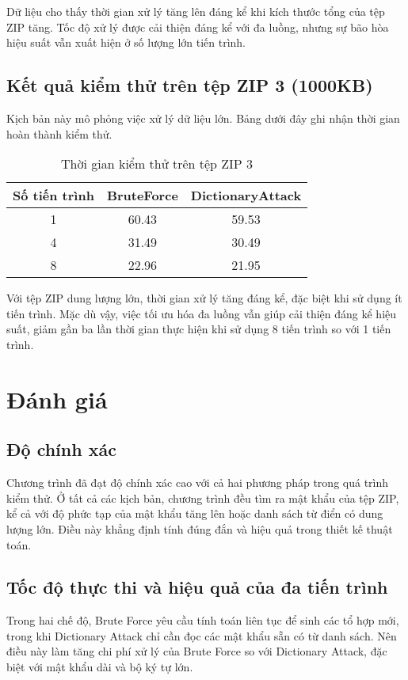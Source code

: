 \documentclass[../DoAn.tex]{subfiles}
\begin{document}
Dữ liệu cho thấy thời gian xử lý tăng lên đáng kể khi kích thước tổng của tệp ZIP tăng. Tốc độ xử lý được cải thiện đáng kể với đa luồng, nhưng sự bão hòa hiệu suất vẫn xuất hiện ở số lượng lớn tiến trình.

\subsection{Kết quả kiểm thử trên tệp ZIP 3 (1000KB)} 

Kịch bản này mô phỏng việc xử lý dữ liệu lớn. Bảng dưới đây ghi nhận thời gian hoàn thành kiểm thử.

\begin{table}[h]
    \centering
    \begin{tabular}{|c|c|c|}
        \toprule
        \textbf{Số tiến trình} & \textbf{BruteForce} & \textbf{DictionaryAttack} \\
        \midrule
        1 & 60.43& 59.53\\ \hline 
        4 & 31.49& 30.49\\
        8 & 22.96& 21.95\\
        \bottomrule \hline
    \end{tabular}
    \caption{Thời gian kiểm thử trên tệp ZIP 3}
    \label{tab:test1}
\end{table}

Với tệp ZIP dung lượng lớn, thời gian xử lý tăng đáng kể, đặc biệt khi sử dụng ít tiến trình. Mặc dù vậy, việc tối ưu hóa đa luồng vẫn giúp cải thiện đáng kể hiệu suất, giảm gần ba lần thời gian thực hiện khi sử dụng 8 tiến trình so với 1 tiến trình.

\section{Đánh giá}
\subsection{Độ chính xác}

Chương trình đã đạt độ chính xác cao với cả hai phương pháp trong quá trình kiểm thử. Ở tất cả các kịch bản, chương trình đều tìm ra mật khẩu của tệp ZIP, kể cả với độ phức tạp của mật khẩu tăng lên hoặc danh sách từ điển có dung lượng lớn. Điều này khẳng định tính đúng đắn và hiệu quả trong thiết kế thuật toán.

\subsection{Tốc độ thực thi và hiệu quả của đa tiến trình}
Trong hai chế độ, Brute Force yêu cầu tính toán liên tục để sinh các tổ hợp mới, trong khi Dictionary Attack chỉ cần đọc các mật khẩu sẵn có từ danh sách. Nên điều này làm tăng chi phí xử lý của Brute Force so với Dictionary Attack, đặc biệt với mật khẩu dài và bộ ký tự lớn.
\end{document}
